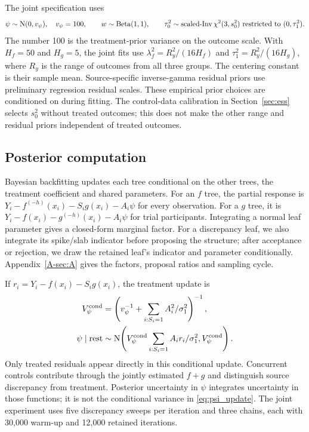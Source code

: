 \documentclass[11pt]{article}
\begin{document}
The joint specification uses
\begin{equation}\label{eq:hyper}
\psi\sim\mathrm{N}(0,v_\psi),\quad v_\psi=100,\qquad
w\sim\operatorname{Beta}(1,1),\qquad
\tau_0^2\sim\operatorname{scaled\text{-}Inv}\chi^2(3,s_0^2)
\text{ restricted to }(0,\tau_1^2).
\end{equation}
The number 100 is the treatment-prior variance on the outcome scale. With $H_f=50$ and $H_g=5$, the joint fits use $\lambda_f^2=R_y^2/(16H_f)$ and $\tau_1^2=R_y^2/(16H_g)$, where $R_y$ is the range of outcomes from all three groups. The centering constant is their sample mean. Source-specific inverse-gamma residual priors use preliminary regression residual scales. These empirical prior choices are conditioned on during fitting. The control-data calibration in Section~\ref{sec:ess} selects $s_0^2$ without treated outcomes; this does not make the other range and residual priors independent of treated outcomes.

\subsection{Posterior computation}\label{sec:computation}
Bayesian backfitting updates each tree conditional on the other trees, the treatment coefficient and shared parameters. For an $f$ tree, the partial response is $Y_i-f^{(-h)}(x_i)-S_i g(x_i)-A_i\psi$ for every observation. For a $g$ tree, it is $Y_i-f(x_i)-g^{(-h)}(x_i)-A_i\psi$ for trial participants. Integrating a normal leaf parameter gives a closed-form marginal factor. For a discrepancy leaf, we also integrate its spike/slab indicator before proposing the structure; after acceptance or rejection, we draw the retained leaf's indicator and parameter conditionally. Appendix~\ref{A-sec:A} gives the factors, proposal ratios and sampling cycle.

If $r_i=Y_i-f(x_i)-S_i g(x_i)$, the treatment update is
\begin{equation}\label{eq:psi_update}
\begin{aligned}
V_\psi^{\mathrm{cond}}&=\left(v_\psi^{-1}+\sum_{i:S_i=1}A_i^2/\sigma_1^2\right)^{-1},\\
\psi\mid\mathrm{rest}&\sim\mathrm{N}\!\left(
V_\psi^{\mathrm{cond}}\sum_{i:S_i=1}A_i r_i/\sigma_1^2,
V_\psi^{\mathrm{cond}}\right).
\end{aligned}
\end{equation}
Only treated residuals appear directly in this conditional update. Concurrent controls contribute through the jointly estimated $f+g$ and distinguish source discrepancy from treatment. Posterior uncertainty in $\psi$ integrates uncertainty in those functions; it is not the conditional variance in \eqref{eq:psi_update}. The joint experiment uses five discrepancy sweeps per iteration and three chains, each with 30,000 warm-up and 12,000 retained iterations.
\end{document}
